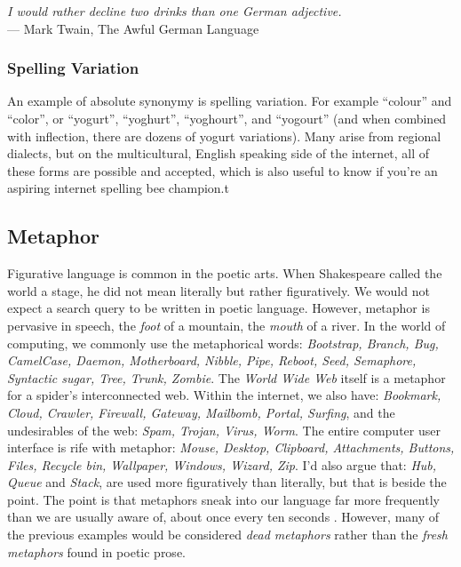 \begin{center}
\textit{I would rather decline two drinks than one German adjective.}
\\ --- Mark Twain, The Awful German Language
\end{center}

\subsubsection{Spelling Variation}
An example of absolute synonymy is spelling variation. For example ``colour'' and ``color'', or ``yogurt'', ``yoghurt'', ``yoghourt'', and ``yogourt'' (and when combined with inflection, there are dozens of yogurt variations). Many arise from regional dialects, but on the multicultural, English speaking side of the internet, all of these forms are possible and accepted, which is also useful to know if you're an aspiring internet spelling bee champion.t


\subsection{Metaphor}
Figurative language is common in the poetic arts. When Shakespeare called the world a stage, he did not mean literally but rather figuratively. We would not expect a search query to be written in poetic language. However, metaphor is pervasive in speech, the \textit{foot} of a mountain, the \textit{mouth} of a river. In the world of computing, we commonly use the metaphorical words: \textit{Bootstrap, Branch, Bug, CamelCase, Daemon, Motherboard, Nibble, Pipe, Reboot, Seed, Semaphore, Syntactic sugar, Tree, Trunk, Zombie}. The \textit{World Wide Web} itself is a metaphor for a spider's interconnected web. Within the internet, we also have: \textit{Bookmark, Cloud, Crawler, Firewall, Gateway, Mailbomb, Portal, Surfing}, and the undesirables of the web: \textit{Spam, Trojan, Virus, Worm}. The entire computer user interface is rife with metaphor: \textit{Mouse, Desktop, Clipboard, Attachments, Buttons, Files, Recycle bin, Wallpaper, Windows, Wizard, Zip}. I'd also argue that: \textit{Hub, Queue} and \textit{Stack}, are used more figuratively than literally, but that is beside the point. The point is that metaphors sneak into our language far more frequently than we are usually aware of, about once every ten seconds \cite{geary2011other}. However, many of the previous examples would be considered \textit{dead metaphors} rather than the \textit{fresh metaphors} found in poetic prose.

